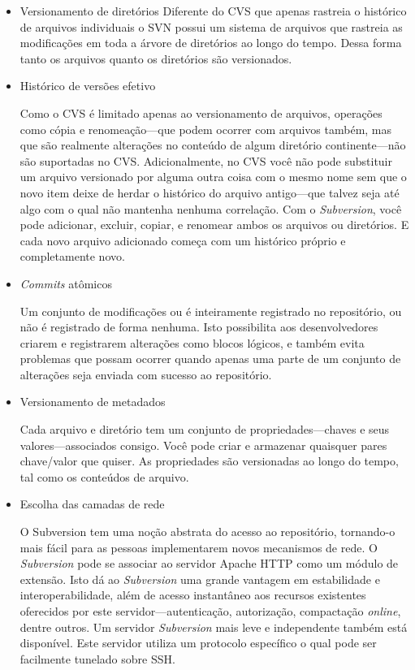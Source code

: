   \begin{itemize}
  \item Versionamento de diretórios
  Diferente do CVS que apenas rastreia o histórico de arquivos individuais o SVN possui um sistema de arquivos que rastreia as modificações em toda a árvore de diretórios ao longo do tempo. Dessa forma tanto os arquivos quanto os diretórios são versionados.

  \item Histórico de versões efetivo

  Como o CVS é limitado apenas ao versionamento de arquivos, operações como cópia e renomeação—que podem ocorrer com arquivos também, mas que são realmente alterações no conteúdo de algum diretório continente—não são suportadas no CVS. Adicionalmente, no CVS você não pode substituir um arquivo versionado por alguma outra coisa com o mesmo nome sem que o novo item deixe de herdar o histórico do arquivo antigo—que talvez seja até algo com o qual não mantenha nenhuma correlação. Com o \textit{Subversion}, você pode adicionar, excluir, copiar, e renomear ambos os arquivos ou diretórios. E cada novo arquivo adicionado começa com um histórico próprio e completamente novo.

  \item \textit{Commits} atômicos

  Um conjunto de modificações ou é inteiramente registrado no repositório, ou não é registrado de forma nenhuma. Isto possibilita aos desenvolvedores criarem e registrarem alterações como blocos lógicos, e também evita problemas que possam ocorrer quando apenas uma parte de um conjunto de alterações seja enviada com sucesso ao repositório.

  \item Versionamento de metadados

  Cada arquivo e diretório tem um conjunto de propriedades—chaves e seus valores—associados consigo. Você pode criar e armazenar quaisquer pares chave/valor que quiser. As propriedades são versionadas ao longo do tempo, tal como os conteúdos de arquivo.

  \item Escolha das camadas de rede

  O Subversion tem uma noção abstrata do acesso ao repositório, tornando-o mais fácil para as pessoas implementarem novos mecanismos de rede. O \textit{Subversion} pode se associar ao servidor Apache HTTP como um módulo de extensão. Isto dá ao \textit{Subversion} uma grande vantagem em estabilidade e interoperabilidade, além de acesso instantâneo aos recursos existentes oferecidos por este servidor—autenticação, autorização, compactação \textit{online}, dentre outros. Um servidor \textit{Subversion} mais leve e independente também está disponível. Este servidor utiliza um protocolo específico o qual pode ser facilmente tunelado sobre SSH.


\end{itemize}
